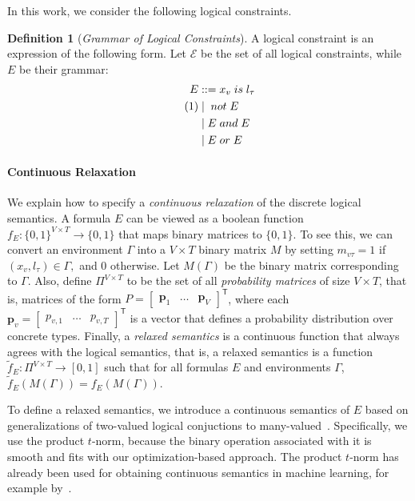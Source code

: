 \documentclass[sigplan,10pt,review,anonymous]{acmart} %
\newcommand\numberthis{\addtocounter{equation}{1}\tag{\theequation}}
\theoremstyle{plain}
\theoremstyle{remark}
\theoremstyle{definition}
\newtheorem{defn}{Definition}[section]
\begin{document}
In this work, we consider the following logical constraints.
\begin{defn}[\emph{Grammar of Logical Constraints}]\label{def:log-gram}
  A logical constraint is an expression of the following form.
  Let $\mathcal{E}$ be the set of all logical constraints, while $E$ be their grammar:
  \begin{align*}
    E & ::= x_v \mathrel{is} l_\tau \\ \numberthis\label{eq:gram}
      & \mid{} \mathrel{not} E      \\
      & \mid E \mathrel{and} E      \\
      & \mid E \mathrel{or} E
  \end{align*}
\end{defn}
\paragraph{Continuous Relaxation}
We explain how to specify a \emph{continuous relaxation} of the discrete logical semantics.
A formula $E$ can be viewed as a boolean function $f_E: \{0, 1\}^{V \times T} \rightarrow \{0, 1\}$
that maps binary matrices to $\{0, 1\}$.
To see this, we can convert an environment
$\Gamma$ into a $V \times T$ binary matrix $M$ by setting $m_{v\tau} = 1$ if
$(x_v, l_\tau) \in \Gamma,$ and 0 otherwise.
Let $M(\Gamma)$ be the binary
matrix corresponding to $\Gamma$.
Also, define $\Pi^{V \times T}$ to be the set
of all \emph{probability matrices} of size $V \times T$,
that is, matrices of the form $P = \begin{bmatrix} \bm{p}_1 & \ldots & \bm{p}_{V} \end{bmatrix}^\mathsf{T}$,
where each $\bm{p}_v = \begin{bmatrix} p_{v,1} & \ldots & p_{v,{T}} \end{bmatrix}^\mathsf{T}$
is a vector that defines a probability distribution over concrete types.
Finally, a \emph{relaxed semantics} is a continuous function
that always agrees with the logical semantics, that is,
a relaxed semantics is a function
$\tilde{f}_{E} : \Pi^{V \times T}  \rightarrow [0, 1]$
such that for all formulas $E$ and environments $\Gamma$,
$\tilde{f}_{E}(M(\Gamma)) = f_E(M(\Gamma)).$

To define a relaxed semantics, we introduce a continuous semantics of $E$ based on generalizations of two-valued logical conjuctions
to many-valued~\cite{hajek1998}.
Specifically, we use the product $t$-norm, because the binary operation associated with it is smooth and fits with our optimization-based approach.
The product $t$-norm has already been used for obtaining continuous semantics in machine learning, for example by~\citet{rocktaschel15}.
\end{document}
